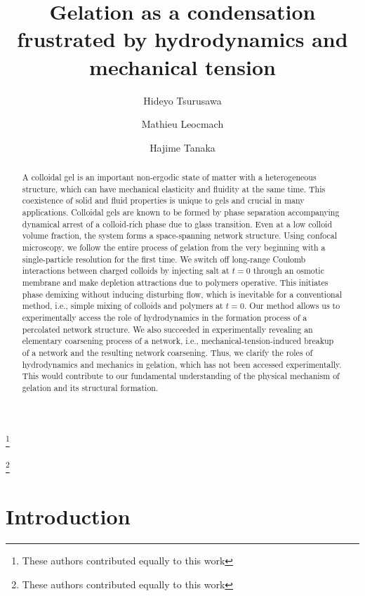 



\title{Gelation as a condensation frustrated by hydrodynamics and mechanical tension}
\author{Hideyo Tsurusawa}
\thanks{These authors contributed equally to this work}
\author{Mathieu Leocmach}
\thanks{These authors contributed equally to this work}
\author{Hajime Tanaka}

\begin{abstract}
A colloidal gel is an important non-ergodic state of matter with a heterogeneous structure, which can have mechanical elasticity and fluidity at the same time. This coexistence of solid and fluid properties is unique to gels and crucial in many applications. Colloidal gels are known to be formed by phase separation accompanying dynamical arrest of a colloid-rich phase due to glass transition. Even at a low colloid volume fraction, the system forms a space-spanning network structure. Using confocal microscopy, we follow the entire process of gelation from the very beginning with a single-particle resolution for the first time. We switch off long-range Coulomb interactions between charged colloids by injecting salt at $t=0$ through an osmotic membrane and make depletion attractions due to polymers operative. This initiates phase demixing without inducing disturbing flow, which is inevitable for a conventional method, i.e., simple mixing of colloids and polymers at $t=0$. Our method allows us to experimentally access the role of hydrodynamics in the formation process of a percolated network structure. We also succeeded in experimentally revealing an elementary coarsening process of a network, i.e., mechanical-tension-induced breakup of a network and the resulting network coarsening. Thus, we clarify the roles of hydrodynamics and mechanics in gelation, which has not been accessed experimentally. This would contribute to our fundamental understanding of the physical mechanism of gelation and its structural formation.
\end{abstract}

\maketitle

\section*{Introduction} 



